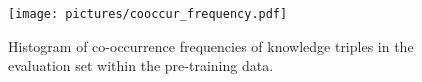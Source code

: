 
\begin{figure}[tb]
\vskip 0.2in
\begin{center}
\centerline{\texttt{[image: pictures/cooccur\_frequency.pdf]}}
\caption{Histogram of co-occurrence frequencies of knowledge triples in the evaluation set within the pre-training data.}
\label{cooccur_frequency}
\end{center}
\vskip -0.3in
\end{figure}